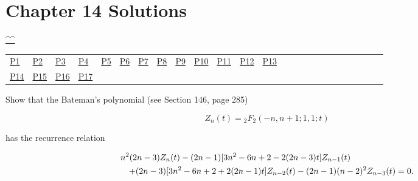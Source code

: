 \section{Chapter 14 Solutions}
\begin{center}\hyperref[toc]{\^{}\^{}}\end{center}
\begin{center}\begin{tabular}{lllllllllllllllllllllllll}
\hyperref[problem1chapter14]{P1} & \hyperref[problem2chapter14]{P2} & \hyperref[problem3chapter14]{P3} & \hyperref[problem4chapter14]{P4} & \hyperref[problem5chapter14]{P5} & \hyperref[problem6chapter14]{P6} & \hyperref[problem7chapter14]{P7} & \hyperref[problem8chapter14]{P8} & \hyperref[problem9chapter14]{P9} & \hyperref[problem10chapter14]{P10} & \hyperref[problem11chapter14]{P11} & \hyperref[problem12chapter14]{P12} & \hyperref[problem13chapter14]{P13} \\
\hyperref[problem14chapter14]{P14} & \hyperref[problem15chapter14]{P15} & \hyperref[problem16chapter14]{P16} & \hyperref[problem17chapter14]{P17} 
\end{tabular}\end{center}
\setcounter{problem}{0}
\setcounter{solution}{0}
\begin{problem}\label{problem1chapter14}
Show that the Bateman's polynomial (see Section 146, page 285)

$$Z_n(t) = {}_2F_2(-n,n+1;1,1;t)$$

has the recurrence relation

\begin{eqnarray*}
\lefteqn{n^2(2n-3)Z_n(t) - (2n-1)[3n^2-6n+2-2(2n-3)t]Z_{n-1}(t)} \\
& &  +(2n-3)[3n^2-6n+2+2(2n-1)t]Z_{n-2}(t) - (2n-1)(n-2)^2Z_{n-3}(t)=0.
\end{eqnarray*}
  
\end{problem}

